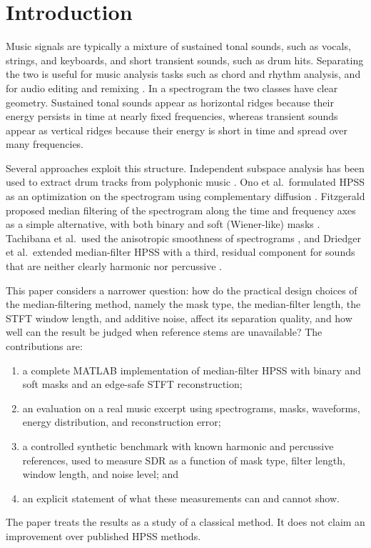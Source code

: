 \documentclass[conference]{IEEEtran}
\begin{document}
\section{Introduction}
Music signals are typically a mixture of sustained tonal sounds, such as vocals, strings, and keyboards, and short transient sounds, such as drum hits. Separating the two is useful for music analysis tasks such as chord and rhythm analysis, and for audio editing and remixing \cite{muller2015}. In a spectrogram the two classes have clear geometry. Sustained tonal sounds appear as horizontal ridges because their energy persists in time at nearly fixed frequencies, whereas transient sounds appear as vertical ridges because their energy is short in time and spread over many frequencies.

Several approaches exploit this structure. Independent subspace analysis has been used to extract drum tracks from polyphonic music \cite{uhle2003}. Ono et al.\ formulated HPSS as an optimization on the spectrogram using complementary diffusion \cite{ono2008}. Fitzgerald proposed median filtering of the spectrogram along the time and frequency axes as a simple alternative, with both binary and soft (Wiener-like) masks \cite{fitzgerald2010}. Tachibana et al.\ used the anisotropic smoothness of spectrograms \cite{tachibana2014}, and Driedger et al.\ extended median-filter HPSS with a third, residual component for sounds that are neither clearly harmonic nor percussive \cite{driedger2014}.

This paper considers a narrower question: how do the practical design choices of the median-filtering method, namely the mask type, the median-filter length, the STFT window length, and additive noise, affect its separation quality, and how well can the result be judged when reference stems are unavailable? The contributions are:
\begin{enumerate}
\item a complete MATLAB implementation of median-filter HPSS with binary and soft masks and an edge-safe STFT reconstruction;
\item an evaluation on a real music excerpt using spectrograms, masks, waveforms, energy distribution, and reconstruction error;
\item a controlled synthetic benchmark with known harmonic and percussive references, used to measure SDR as a function of mask type, filter length, window length, and noise level; and
\item an explicit statement of what these measurements can and cannot show.
\end{enumerate}
The paper treats the results as a study of a classical method. It does not claim an improvement over published HPSS methods.
\end{document}
